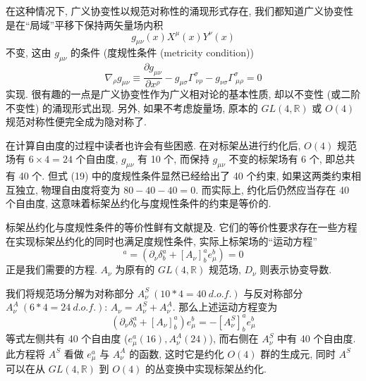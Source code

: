 \documentclass{article}
\begin{document}
 在这种情况下, 广义协变性以规范对称性的涌现形式存在, 我们都知道广义协变性是在``局域''平移下保持两矢量场内积
 \begin{equation}
 g_{\mu\nu}(x)X^{\mu}(x)Y^{\nu}(x)
 \end{equation}不变, 这由 $g_{\mu\nu}$ 的条件 (度规性条件 (metricity condition))
\begin{equation}
\nabla_{\rho}g_{\mu\nu}\equiv \frac{\partial g_{\mu\nu}}{\partial x^{\rho}}-g_{\mu\sigma}\Gamma_{\ \nu\rho}^{\sigma}-g_{\nu\sigma}\Gamma_{\ \mu\rho}^{\sigma}=0
\end{equation}
实现. 很有趣的一点是广义协变性作为广义相对论的基本性质, 却以不变性 (或二阶不变性) 的涌现形式出现. 另外, 如果不考虑旋量场, 原本的 $GL(4,\mathbb{R})$ 或 $O(4)$ 规范对称性便完全成为隐对称了.

在计算自由度的过程中读者也许会有些困惑. 在对标架丛进行约化后, $O(4)$ 规范场有 $6\times4=24$ 个自由度, $g_{\mu\nu}$ 有 10 个, 而保持 $g_{\mu\nu}$ 不变的标架场有 6 个, 即总共有 40 个. 但式 (19) 中的度规性条件显然已经给出了 40 个约束, 如果这两类约束相互独立, 物理自由度将变为 $80-40-40=0$. 而实际上, 约化后仍然应当存在 40 个自由度, 这意味着标架丛约化与度规性条件的约束是等价的.

标架丛约化与度规性条件的等价性鲜有文献提及. 它们的等价性要求存在一些方程在实现标架丛约化的同时也满足度规性条件, 实际上标架场的``运动方程''
\begin{equation}
[D_{\nu}e_{\mu}]^{a}=(\partial_{\nu}\delta_{b}^{a}+[A_{\nu}]^{a}_{b}e_{\mu}^{b})=0
\end{equation}
正是我们需要的方程. $A_{\nu}$ 为原有的 $GL(4,\mathbb{R})$ 规范场, $D_{\nu}$ 则表示协变导数.

我们将规范场分解为对称部分 $A_{\nu}^{S}\ (10*4=40\ d.o.f.)$ 与反对称部分 $A_{\nu}^{A}\ (6*4=24\ d.o.f.)$: $A_{\nu}=A_{\nu}^{S}+A_{\nu}^{A}$. 那么上述运动方程变为
\begin{equation}
(\partial_{\nu}\delta_{b}^{a}+[A_{\nu}]^{a}_{b})e_{\mu}^{b}=-[A_{\nu}^{S}]_{b}^{a}e_{\mu}^{b}
\end{equation}
等式左侧共有 40 个自由度 ($e_{\mu}^{a}(16),A_{\nu}^{A}(24)$), 而右侧在 $A_{\nu}^{S}$ 中有 40 个自由度. 此方程将 $A^{S}$ 看做 $e_{\mu}^{a}$ 与 $A_{\nu}^{A}$ 的函数, 这时它是约化 $O(4)$ 群的生成元, 同时 $A^{S}$ 可以在从 $GL(4,\mathbb{R})$ 到 $O(4)$ 的丛变换中实现标架丛约化.
\end{document}
